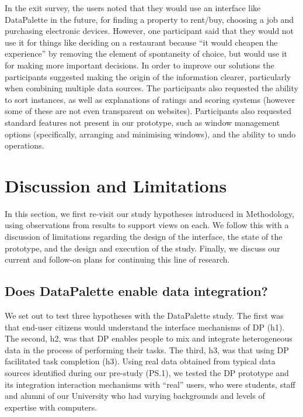 \documentclass{sigchi}
\begin{document}
In the exit survey, the users noted that they would use an interface like DataPalette in the future, for finding a property to rent/buy, choosing a job and purchasing electronic devices.  However, one participant said that they would not use it for things like deciding on a restaurant because ``it would cheapen the experience'' by removing the element of spontaneity of choice, but would use it for making more important decisions.  In order to improve our solutions the participants suggested making the origin of the information clearer, particularly when combining multiple data sources. The participants also requested the ability to sort instances, as well as explanations of ratings and scoring systems (however some of these are not even transparent on websites). Participants also requested standard features not present in our prototype, such as window management options (specifically, arranging and minimising windows), and the ability to undo operations.

\section{Discussion and Limitations}

In this section, we first re-visit our study hypotheses introduced in Methodology, using observations from results to support views on each.  We follow this with a discussion of limitations regarding the design of the interface, the state of the prototype, and the design and execution of the study.  Finally, we discuss our current and follow-on plans for continuing this line of research.

\subsection{Does DataPalette enable data integration?}

We set out to test three hypotheses with the DataPalette study. The first was that end-user citizens would understand the interface mechanisms of DP (h1).  The second, h2, was that DP enables people to mix and integrate heterogeneous data in the process of performing their tasks.  The third, h3, was that using DP facilitated task completion (h3).  Using real data obtained from typical data sources identified during our pre-study (PS.1), we tested the DP prototype and its integration interaction mechanisms with ``real'' users, who were students, staff and alumni of our University who had varying backgrounds and levels of expertise with computers.
\end{document}
